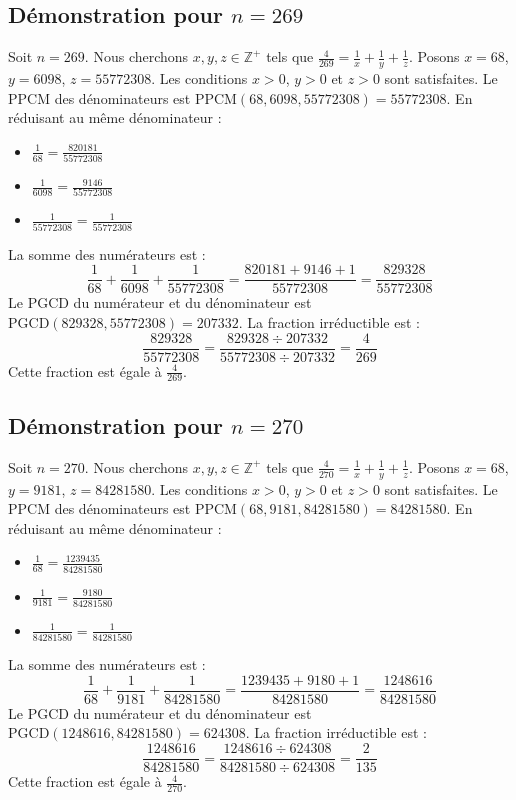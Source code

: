 \documentclass[11pt,a4paper]{article}
\begin{document}
\subsection{Démonstration pour $n = 269$}
Soit $n = 269$. Nous cherchons $x, y, z \in \mathbb{Z}^{+}$ tels que $\frac{4}{269} = \frac{1}{x} + \frac{1}{y} + \frac{1}{z}$.
Posons $x = 68$, $y = 6098$, $z = 55772308$.
Les conditions $x > 0$, $y > 0$ et $z > 0$ sont satisfaites.
Le PPCM des dénominateurs est $\text{PPCM}(68, 6098, 55772308) = 55772308$.
En réduisant au même dénominateur :
\begin{itemize}
    \item $\frac{1}{68} = \frac{820181}{55772308}$
    \item $\frac{1}{6098} = \frac{9146}{55772308}$
    \item $\frac{1}{55772308} = \frac{1}{55772308}$
\end{itemize}
La somme des numérateurs est :
$$ \frac{1}{68} + \frac{1}{6098} + \frac{1}{55772308} = \frac{820181 + 9146 + 1}{55772308} = \frac{829328}{55772308} $$
Le PGCD du numérateur et du dénominateur est $\text{PGCD}(829328, 55772308) = 207332$.
La fraction irréductible est :
$$ \frac{829328}{55772308} = \frac{829328 \div 207332}{55772308 \div 207332} = \frac{4}{269} $$
Cette fraction est égale à $\frac{4}{269}$.

\subsection{Démonstration pour $n = 270$}
Soit $n = 270$. Nous cherchons $x, y, z \in \mathbb{Z}^{+}$ tels que $\frac{4}{270} = \frac{1}{x} + \frac{1}{y} + \frac{1}{z}$.
Posons $x = 68$, $y = 9181$, $z = 84281580$.
Les conditions $x > 0$, $y > 0$ et $z > 0$ sont satisfaites.
Le PPCM des dénominateurs est $\text{PPCM}(68, 9181, 84281580) = 84281580$.
En réduisant au même dénominateur :
\begin{itemize}
    \item $\frac{1}{68} = \frac{1239435}{84281580}$
    \item $\frac{1}{9181} = \frac{9180}{84281580}$
    \item $\frac{1}{84281580} = \frac{1}{84281580}$
\end{itemize}
La somme des numérateurs est :
$$ \frac{1}{68} + \frac{1}{9181} + \frac{1}{84281580} = \frac{1239435 + 9180 + 1}{84281580} = \frac{1248616}{84281580} $$
Le PGCD du numérateur et du dénominateur est $\text{PGCD}(1248616, 84281580) = 624308$.
La fraction irréductible est :
$$ \frac{1248616}{84281580} = \frac{1248616 \div 624308}{84281580 \div 624308} = \frac{2}{135} $$
Cette fraction est égale à $\frac{4}{270}$.
\end{document}
